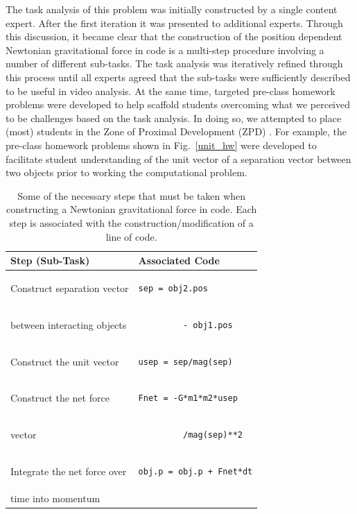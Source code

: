 \documentclass{msuphddissertation}
\begin{document}
\begin{doublespace}
The task analysis of this problem was initially constructed by a single content expert. After the first iteration it was presented to additional experts. Through this discussion, it became clear that the construction of the position dependent Newtonian gravitational force in code is a multi-step procedure involving a number of different sub-tasks. The task analysis was iteratively refined through this process until all experts agreed that the sub-tasks were sufficiently described to be useful in video analysis. At the same time, targeted pre-class homework problems were developed to help scaffold students overcoming what we perceived to be challenges based on the task analysis.  In doing so, we attempted to place (most) students in the Zone of Proximal Development (ZPD) \cite{vyg}. For example, the pre-class homework problems shown in Fig.~\ref{unit_hw} were developed to facilitate student understanding of the unit vector of a separation vector between two objects prior to working the computational problem.

\begin{table}[hb]
\caption{Some of the necessary steps that must be taken when constructing a Newtonian gravitational force in code.  Each step is associated with the construction/modification of a line of code.\label{tab1}}
\begin{tabular}{ll}
\textbf{Step (Sub-Task)} & \textbf{Associated Code} \\\hline
Construct separation vector & \begin{lstlisting}
sep = obj2.pos
\end{lstlisting}\\
between interacting objects & \begin{lstlisting}
         - obj1.pos
\end{lstlisting}\\\hline
Construct the unit vector & \begin{lstlisting}
usep = sep/mag(sep)
\end{lstlisting}\\\hline
Construct the net force & \begin{lstlisting}
Fnet = -G*m1*m2*usep
\end{lstlisting}\\
vector & \begin{lstlisting}
         /mag(sep)**2
\end{lstlisting}\\\hline
Integrate the net force over & \begin{lstlisting}
obj.p = obj.p + Fnet*dt
\end{lstlisting}\\
time into momentum & \\
\end{tabular}
\end{table}


\end{doublespace}
\end{document}
